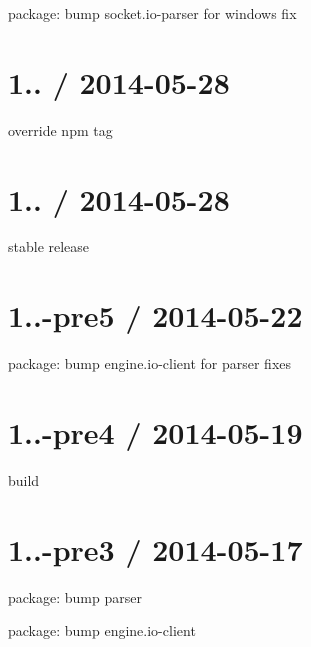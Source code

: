 \begin{DoxyItemize}
\item package\+: bump {\ttfamily socket.\+io-\/parser} for windows fix
\end{DoxyItemize}

\section*{1.. / 2014-\/05-\/28 }


\begin{DoxyItemize}
\item override npm tag
\end{DoxyItemize}

\section*{1.. / 2014-\/05-\/28 }


\begin{DoxyItemize}
\item stable release
\end{DoxyItemize}

\section*{1..-\/pre5 / 2014-\/05-\/22 }


\begin{DoxyItemize}
\item package\+: bump {\ttfamily engine.\+io-\/client} for parser fixes
\end{DoxyItemize}

\section*{1..-\/pre4 / 2014-\/05-\/19 }


\begin{DoxyItemize}
\item build
\end{DoxyItemize}

\section*{1..-\/pre3 / 2014-\/05-\/17 }


\begin{DoxyItemize}
\item package\+: bump parser
\item package\+: bump engine.\+io-\/client
\end{DoxyItemize}

